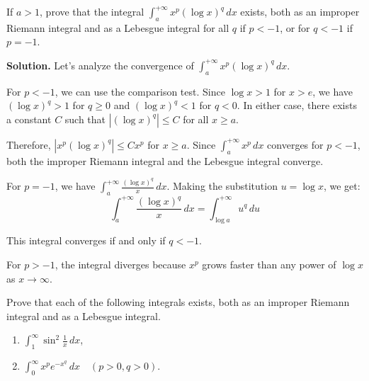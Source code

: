 \begin{problembox}
If $a > 1$, prove that the integral $\int_{a}^{+\infty} x^p (\log x)^q \, dx$ exists, both as an improper Riemann integral and as a Lebesgue integral for all $q$ if $p < -1$, or for $q < -1$ if $p = -1$.
\end{problembox}

\noindent\textbf{Solution.}
Let's analyze the convergence of $\int_{a}^{+\infty} x^p (\log x)^q \, dx$.

For $p < -1$, we can use the comparison test. Since $\log x > 1$ for $x > e$, we have $(\log x)^q > 1$ for $q \geq 0$ and $(\log x)^q < 1$ for $q < 0$. In either case, there exists a constant $C$ such that $|(\log x)^q| \leq C$ for all $x \geq a$.

Therefore, $|x^p (\log x)^q| \leq C x^p$ for $x \geq a$. Since $\int_{a}^{+\infty} x^p \, dx$ converges for $p < -1$, both the improper Riemann integral and the Lebesgue integral converge.

For $p = -1$, we have $\int_{a}^{+\infty} \frac{(\log x)^q}{x} \, dx$. Making the substitution $u = \log x$, we get:
\[\int_{a}^{+\infty} \frac{(\log x)^q}{x} \, dx = \int_{\log a}^{+\infty} u^q \, du\]

This integral converges if and only if $q < -1$.

For $p > -1$, the integral diverges because $x^p$ grows faster than any power of $\log x$ as $x \to \infty$.

\begin{problembox}
Prove that each of the following integrals exists, both as an improper Riemann integral and as a Lebesgue integral.
\begin{enumerate}[label=(\alph*)]
    \item $\int_{1}^{\infty} \sin^2 \frac{1}{x} \, dx$,
    \item $\int_{0}^{\infty} x^pe^{-x^q} \, dx \quad (p > 0, q > 0)$.
\end{enumerate}
\end{problembox}

